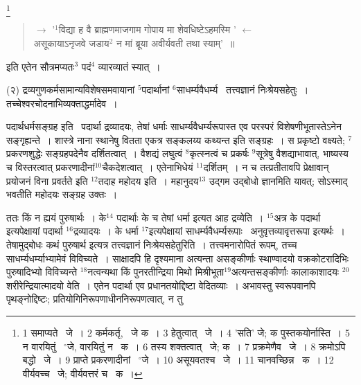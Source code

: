 \documentclass[11pt, openany]{book}
\newcommand\blfootnote[1]{%
 \begingroup
 \renewcommand\thefootnote{}\footnote{#1}%
 \addtocounter{footnote}{-1}%
 \endgroup
}
\begin{document}
\blfootnote{1 समाप्यते  \textendash\ जे~। 2 कर्मकर्तृ,  \textendash\ जे क~। 3 हेतुत्वात् \textendash\ जे~। 4 'सति' जे; क पुस्तकयोर्नास्ति~। 5 न वारयितुं  \textendash\  ${}^\circ$जे, वारयितुं न  \textendash\ क~। 6 तस्य शक्तत्वात्  \textendash\ जे; क~। 7 प्रक्रमेणैव \textendash\ जे~। 8 क्रमोऽपि बद्धो \textendash\ जे~। 9 प्राप्ते प्रकरणादीनां \textendash\  ${}^\circ$जे~। 10 असूयवतश्च \textendash\ जे~। 11 चानवच्छिन्न  \textendash\ क~। 12 वीर्यवच्च  \textendash\ जे; वीर्यवत्तरं च  \textendash\ क~।}

\newpage
\begin{quote}
{\qt $\rightarrow$ '${}^1$विद्या ह वै ब्राह्मणमाजगाम गोपाय मा शेवधिष्टेऽहमस्मि ' $\leftarrow$\\
असूकायाऽनृजवे जडाय$^2$ न मां ब्रूया अवीर्यवती तथा स्याम्'~॥}
\end{quote}

\noindent
इति एतेन सौत्रमप्यतः$^3$ पदं$^4$ व्यारव्यातं स्यात्~।

\hangindent=2cm {\knu (२) द्रव्यगुणकर्मसामान्यविशेषसमवायानां ${}^5$पदार्थानां ${}^6$साधर्म्यवैधर्म्य \textendash\ तत्त्वज्ञानं निःश्रेयसहेतुः~। तच्चेश्वरचोदनाभिव्यक्ताद्धर्मादेव~।}

{\knu पदार्थधर्म}सङ्ग्रह इति \textendash\ पदार्था द्रव्यादयः, तेषां धर्माः साधर्म्यवैधर्म्यरूपास्त एव परस्परं विशेषणीभूतास्तेऽनेन सङ्गृह्यन्ते~। शास्त्रे नाना स्थानेषु वितता एकत्र सङ्कलय्य कथ्यन्त इति सङ्ग्रहः~। स प्रकृष्टो वक्ष्यते; ${}^7$प्रकरणशुद्धेः सङ्ग्रहपदेनैव दर्शितत्वात्~। वैशद्यं लघुत्वं ${}^8$कृत्स्नत्वं च प्रकर्षः ${}^9$सूत्रेषु वैशद्याभावात्, भाष्यस्य च विस्तरत्वात् प्रकरणादीनां${}^10$चैकदेशत्वात्~। एतेनाभिधेयं ${}^11$दर्शितम्~। न च तत्प्रतीतावपि प्रेक्षावान् प्रयोजनं विना प्रवर्तते इति ${}^12$तदाह {\knu महोदय} इति~। महानुदय$^13$ उद्गम उद्बोधो ज्ञानमिति यावत्; सोऽस्माद् भवतीति महोदयः सङ्ग्रह उक्तः~।

ततः किं न ह्ययं पुरुषार्थः~। के$^14$ पदार्थाः के च तेषां धर्मा इत्यत आह {\knu द्रव्ये}ति~। ${}^15$अत्र के पदार्था इत्यपेक्षायां पदार्था ${}^16$द्रव्यादयः~। के धर्मा ${}^17$इत्यपेक्षायां साधर्म्यवैधर्म्यरूपाः \textendash\ अनुवृत्तव्यावृत्तरूपा इत्यर्थः~। तेषामुद्बोधः कथं पुरुषार्थ इत्यत्र {\knu तत्त्वज्ञानं निःश्रेयस}हेतुरिति~। तत्त्वमनारोपितं रूपम्, तच्च साधर्म्यधर्म्याभ्यामेवं विविच्यते~। साक्षादपि हि दृश्यमाना अत्यन्ता असङ्कीर्णाः स्थाण्वादयो वक्रकोटरादिभिः पुरुषादिभ्यो विविच्यन्ते ${}^18$नत्वन्यथा किं पुनरतीन्द्रिया मिथो मिश्रीभूता${}^19$अत्यन्तसङ्कीर्णाः कालाकाशादयः ${}^20$शरीरेन्द्रियात्मादयो वेति~। एतेन पदार्था एव प्रधानतयोद्दिष्टा वेदितव्याः~। अभावस्तु स्वरूपवानपि पृथङ्नोद्दिष्टः; प्रतियोगिनिरूपणाधीननिरूपणत्वात्, न तु
\end{document}
